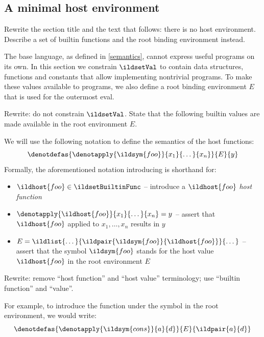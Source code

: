 \subsection{A minimal host environment}
\label{root-env}
\begin{note}
  Rewrite the section title and the text that follows: there is no host
  environment. Describe a set of builtin functions and the root binding
  environment instead.
\end{note}

The base language, as defined in \cref{semantics}, cannot express useful programs on its own. In this section we constrain
\(\ildsetVal\) to contain data structures, functions and constants that allow implementing nontrivial
programs. To make these values available to programs, we also define a root binding environment \(E\)
that is used for the outermost eval.
\begin{note}
  Rewrite: do not constrain \(\ildsetVal\). State that the following builtin
  values are made available in the root environment \(E\).
\end{note}

We will use the following notation
to define the semantics of the host functions:
\begin{equation}
  \denotdefas{\denotapply{\ildsym{foo}}{x_1}{\dots}{x_n}}{E}{y}
\end{equation}
Formally, the aforementioned notation introducing  is shorthand for:
\begin{itemize}
  \item \(\ildhost{foo} \in \ildsetBuiltinFunc\) -- introduce a \(\ildhost{foo}\) \emph{host function}
  \item \( \denotapply{\ildhost{foo}}{x_1}{\dots}{x_n} = y \) -- assert that \(\ildhost{foo}\) applied to \(x_1, \dots, x_n\) results in \( y \)
  \item \(E = \ildlist{\dots}{\ildpair{\ildsym{foo}}{\ildhost{foo}}}{\dots}\) -- assert that the symbol \(\ildsym{foo}\) stands for the host value \(\ildhost{foo}\) in the root environment \(E\)
\end{itemize}
\begin{note}
  Rewrite: remove ``host function'' and ``host value'' terminology; use
  ``builtin function'' and ``value''.
\end{note}
For example, to introduce the function  under the symbol 
in the root environment, we would write:
\begin{equation}
  \denotdefas{\denotapply{\ildsym{cons}}{a}{d}}{E}{\ildpair{a}{d}}
\end{equation}

